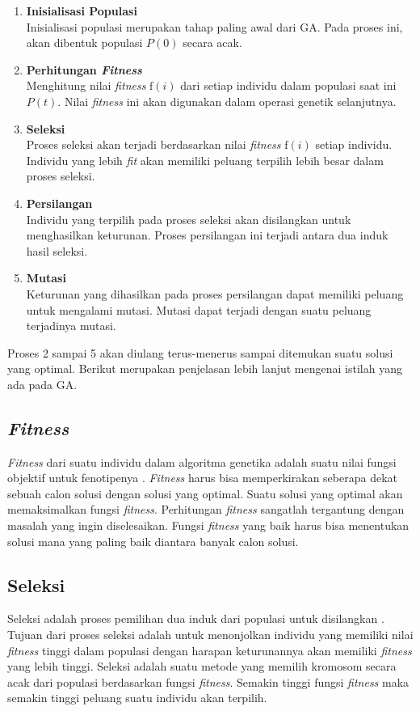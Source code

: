 \begin{enumerate}
	\item \textbf{Inisialisasi Populasi} \\
	Inisialisasi populasi merupakan tahap paling awal dari GA. Pada proses ini, akan dibentuk populasi $P(0)$ secara acak. 
	\item \textbf{Perhitungan \textit{Fitness}} \\
	Menghitung nilai \textit{fitness} $\textrm{f}(i)$ dari setiap individu dalam populasi saat ini $P(t)$. Nilai \textit{fitness} ini akan digunakan dalam operasi genetik selanjutnya.
	\item \textbf{Seleksi} \\
	Proses seleksi akan terjadi berdasarkan nilai \textit{fitness} $\textrm{f}(i)$ setiap individu. Individu yang lebih \textit{fit} akan memiliki peluang terpilih lebih besar dalam proses seleksi.
	\item \textbf{Persilangan} \\
	Individu yang terpilih pada proses seleksi akan disilangkan untuk menghasilkan keturunan. Proses persilangan ini terjadi antara dua induk hasil seleksi.
	\item \textbf{Mutasi} \\
	Keturunan yang dihasilkan pada proses persilangan dapat memiliki peluang untuk mengalami mutasi. Mutasi dapat terjadi dengan suatu peluang terjadinya mutasi.
\end{enumerate}

Proses 2 sampai 5 akan diulang terus-menerus sampai ditemukan suatu solusi yang optimal. Berikut merupakan penjelasan lebih lanjut mengenai istilah yang ada pada GA.

\subsection{\textit{Fitness}}
\label{sub:fitness}
\textit{Fitness} dari suatu individu dalam algoritma genetika adalah suatu nilai fungsi objektif untuk fenotipenya \cite{sivanandam2007introduction}. \textit{Fitness} harus bisa memperkirakan seberapa dekat sebuah calon solusi dengan solusi yang optimal. Suatu solusi yang optimal akan memaksimalkan fungsi \textit{fitness}. Perhitungan \textit{fitness} sangatlah tergantung dengan masalah yang ingin diselesaikan. Fungsi \textit{fitness} yang baik harus bisa menentukan solusi mana yang paling baik diantara banyak calon solusi.

\subsection{Seleksi}
\label{sub:selection}
Seleksi adalah proses pemilihan dua induk dari populasi untuk disilangkan \cite{sivanandam2007introduction}. Tujuan dari proses seleksi adalah untuk menonjolkan individu yang memiliki nilai \textit{fitness} tinggi dalam populasi dengan harapan keturunannya akan memiliki \textit{fitness} yang lebih tinggi. Seleksi adalah suatu metode yang memilih kromosom secara acak dari populasi berdasarkan fungsi \textit{fitness}. Semakin tinggi fungsi \textit{fitness} maka semakin tinggi peluang suatu individu akan terpilih. 

